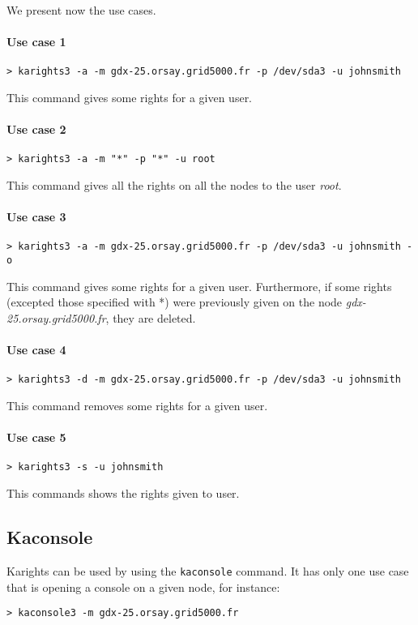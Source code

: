\documentclass[a4wide,10pt,oneside]{book}
\begin{document}
We present now the use cases.
\paragraph{Use case 1}
\begin{verbatim}
> karights3 -a -m gdx-25.orsay.grid5000.fr -p /dev/sda3 -u johnsmith
\end{verbatim}
This command gives some rights for a given user.

\paragraph{Use case 2}
\begin{verbatim}
> karights3 -a -m "*" -p "*" -u root
\end{verbatim}
This command gives all the rights on all the nodes to the user \textit{root}.

\paragraph{Use case 3}
\begin{verbatim}
> karights3 -a -m gdx-25.orsay.grid5000.fr -p /dev/sda3 -u johnsmith -o
\end{verbatim}
This command gives some rights for a given user. Furthermore, if some rights (excepted those specified with *) were previously given on the node \textit{gdx-25.orsay.grid5000.fr}, they are deleted.

\paragraph{Use case 4}
\begin{verbatim}
> karights3 -d -m gdx-25.orsay.grid5000.fr -p /dev/sda3 -u johnsmith
\end{verbatim}
This command removes some rights for a given user.

\paragraph{Use case 5}
\begin{verbatim}
> karights3 -s -u johnsmith
\end{verbatim}
This commands shows the rights given to user.

\subsection{Kaconsole}\label{sec:kaconsole}
Karights can be used by using the \texttt{kaconsole} command. It has only one use case that is opening a console on a given node, for instance:
\begin{verbatim}
> kaconsole3 -m gdx-25.orsay.grid5000.fr
\end{verbatim}
\end{document}
